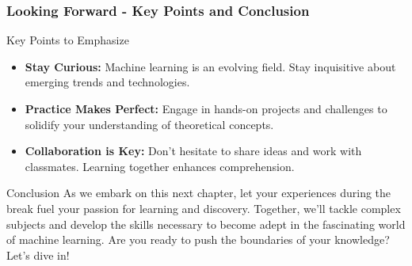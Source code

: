 \documentclass[aspectratio=169]{beamer}
\begin{document}
\begin{frame}[fragile]
  \frametitle{Looking Forward - Key Points and Conclusion}
  \begin{block}{Key Points to Emphasize}
    \begin{itemize}
      \item \textbf{Stay Curious:} Machine learning is an evolving field. Stay inquisitive about emerging trends and technologies.
      \item \textbf{Practice Makes Perfect:} Engage in hands-on projects and challenges to solidify your understanding of theoretical concepts.
      \item \textbf{Collaboration is Key:} Don't hesitate to share ideas and work with classmates. Learning together enhances comprehension.
    \end{itemize}
  \end{block}
  
  \begin{block}{Conclusion}
    As we embark on this next chapter, let your experiences during the break fuel your passion for learning and discovery. Together, we’ll tackle complex subjects and develop the skills necessary to become adept in the fascinating world of machine learning. Are you ready to push the boundaries of your knowledge? Let’s dive in!
  \end{block}
\end{frame}
\end{document}
